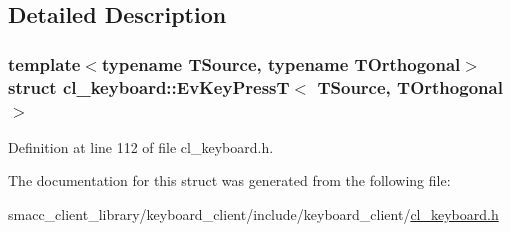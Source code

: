 \subsection{Detailed Description}
\subsubsection*{template$<$typename T\+Source, typename T\+Orthogonal$>$\newline
struct cl\+\_\+keyboard\+::\+Ev\+Key\+Press\+T$<$ T\+Source, T\+Orthogonal $>$}



Definition at line 112 of file cl\+\_\+keyboard.\+h.



The documentation for this struct was generated from the following file\+:\begin{DoxyCompactItemize}
\item 
smacc\+\_\+client\+\_\+library/keyboard\+\_\+client/include/keyboard\+\_\+client/\hyperlink{cl__keyboard_8h}{cl\+\_\+keyboard.\+h}\end{DoxyCompactItemize}
